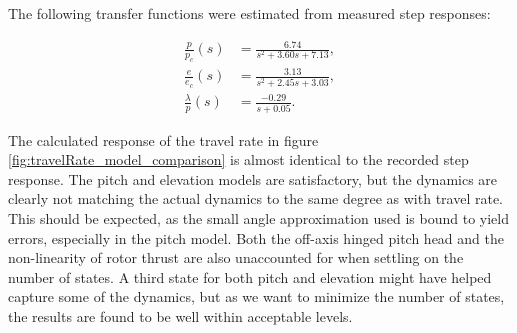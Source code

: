 The following transfer functions were estimated from measured step responses:

\begin{subequations}
\label{eq:tf}
\begin{align}
	\frac{p}{p_c}(s) &= \frac{6.74}{s^2 + 3.60 s + 7.13},\label{eq:p_pc}\\
	\frac{e}{e_c}(s) &= \frac{3.13}{s^2 + 2.45 s + 3.03},\label{eq:e_ec}\\
	\frac{\lambda}{p}(s) &= \frac{-0.29}{s + 0.05}.\label{eq:travelRate_p}
\end{align}
\end{subequations}


The calculated response of the travel rate in figure \ref{fig:travelRate_model_comparison} is almost identical to the recorded step response. The pitch and elevation models are satisfactory, but the dynamics are clearly not matching the actual dynamics to the same degree as with travel rate. This should be expected, as the small angle approximation used is bound to yield errors, especially in the pitch model. Both the off-axis hinged pitch head and the non-linearity of rotor thrust are also unaccounted for when settling on the number of states. A third state for both pitch and elevation might have helped capture some of the dynamics, but as we want to minimize the number of states, the results are found to be well within acceptable levels.



